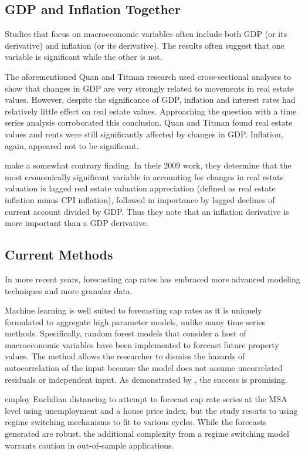 \documentclass[jrfm,article,accept,oneauthor,pdftex]{Definitions/mdpi}
\begin{document}
\subsection{GDP and Inflation Together}

Studies that focus on macroeconomic variables often include both GDP (or its derivative) and inflation (or its derivative). The results often suggest that one variable is significant while the other is not. 

The aforementioned Quan and Titman research used cross-sectional analyses to show that changes in GDP are very strongly related to movements in real estate values. However, despite the significance of GDP, inflation and interest rates had relatively little effect on real estate values. Approaching the question with a time series analysis corroborated this conclusion. Quan and Titman found real estate values and rents were still significantly affected by changes in GDP. Inflation, again, appeared not to be  significant. 

\cite{aizenman2009current} make a somewhat contrary finding. In their 2009 work, they determine that the most economically significant variable in accounting for changes in real estate valuation is lagged real estate valuation appreciation (defined as real estate inflation minus CPI inflation), followed in importance by lagged declines of current account divided by GDP. Thus they note that an inflation derivative is more important than a GDP derivative. 


\subsection{Current Methods}


In more recent years, forecasting cap rates has embraced more advanced modeling techniques and more granular data.

Machine learning is well suited to forecasting cap rates as it is uniquely formulated to aggregate high parameter models, unlike many time series methods. Specifically, random forest models that consider a host of macroeconomic variables have been implemented to forecast future property values. The method allows the researcher to dismiss the hazards of autocorrelation of the input because the model does not assume uncorrelated residuals or independent input. As demonstrated by \cite{kok2017big}, the success is promising. 

\cite{christopoulos2020synthetic} employ Euclidian distancing to attempt to forecast cap rate series at the MSA level using unemployment and a house price index, but the study resorts to using regime switching mechanisms to fit to various cycles. While the forecasts generated are robust, the additional complexity from a regime switching model warrants caution in out-of-sample applications. 
\end{document}
